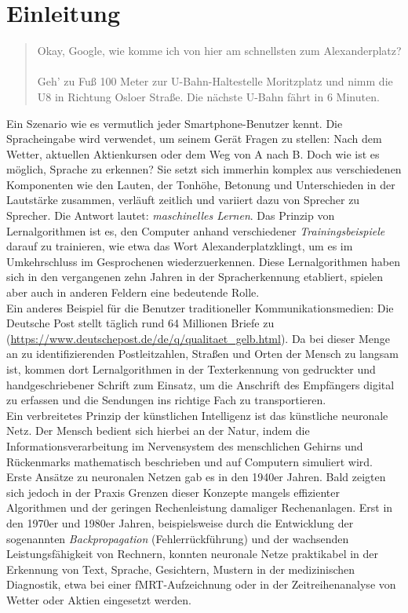 \section{Einleitung}
\begin{quote}
\glqq Okay, Google, wie komme ich von hier am schnellsten zum Alexanderplatz? \grqq\\
\\
\glqq Geh' zu Fuß 100 Meter zur U-Bahn-Haltestelle Moritzplatz und nimm die U8 in Richtung Osloer Straße. Die nächste U-Bahn fährt in 6 Minuten.\grqq
\end{quote}
Ein Szenario wie es vermutlich jeder Smartphone-Benutzer kennt. Die Spracheingabe wird verwendet, um seinem Gerät Fragen zu stellen: Nach dem Wetter, aktuellen Aktienkursen oder dem Weg von A nach B. Doch wie ist es möglich, Sprache zu erkennen? Sie setzt sich immerhin komplex aus verschiedenen Komponenten wie den Lauten, der Tonhöhe, Betonung und Unterschieden in der Lautstärke zusammen, verläuft zeitlich und variiert dazu von Sprecher zu Sprecher. Die Antwort lautet: \emph{maschinelles Lernen}. Das Prinzip von Lernalgorithmen ist es, den Computer anhand verschiedener \emph{Trainingsbeispiele} darauf zu trainieren, wie etwa das Wort \glqq Alexanderplatz\grqq klingt, um es im Umkehrschluss im Gesprochenen wiederzuerkennen. Diese Lernalgorithmen haben sich in den vergangenen zehn Jahren in der Spracherkennung etabliert, spielen aber auch in anderen Feldern eine bedeutende Rolle.\\
Ein anderes Beispiel für die Benutzer traditioneller Kommunikationsmedien: Die Deutsche Post stellt täglich rund 64 Millionen Briefe zu (\url{https://www.deutschepost.de/de/q/qualitaet_gelb.html}). Da bei dieser Menge an zu identifizierenden Postleitzahlen, Straßen und Orten der Mensch zu langsam ist, kommen dort Lernalgorithmen in der Texterkennung von gedruckter und handgeschriebener Schrift zum Einsatz, um die Anschrift des Empfängers digital zu erfassen und die Sendungen ins richtige Fach zu transportieren.\\
Ein verbreitetes Prinzip der künstlichen Intelligenz ist das künstliche neuronale Netz. Der Mensch bedient sich hierbei an der Natur, indem die Informationsverarbeitung im Nervensystem des menschlichen Gehirns und Rückenmarks mathematisch beschrieben und auf Computern simuliert wird.\\
Erste Ansätze zu neuronalen Netzen gab es in den 1940er Jahren. Bald zeigten sich jedoch in der Praxis Grenzen dieser Konzepte mangels effizienter Algorithmen und der geringen Rechenleistung damaliger Rechenanlagen. Erst in den 1970er und 1980er Jahren, beispielsweise durch die Entwicklung der sogenannten \emph{Backpropagation} (Fehlerrückführung) und der wachsenden Leistungsfähigkeit von Rechnern, konnten neuronale Netze praktikabel in der Erkennung von Text, Sprache, Gesichtern, Mustern in der medizinischen Diagnostik, etwa bei einer fMRT-Aufzeichnung oder in der Zeitreihenanalyse von Wetter oder Aktien eingesetzt werden.\\
